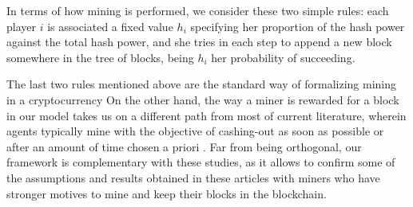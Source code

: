 %
%
In terms of how mining is performed, we consider these two simple rules: each player $i$ is associated
a fixed value $h_i$ specifying her proportion of the hash power 
against the total hash power, and  
she tries in each step to append a new block somewhere in the tree of blocks, being 
$h_i$ her probability of succeeding. 

The last two rules mentioned above 
are the standard way of 
formalizing mining in a cryptocurrency 
On the other hand, the way a miner is rewarded for a block in our model
takes us on a different path from most of current literature, wherein agents typically mine 
with the objective of cashing-out as soon as possible or after an amount of time chosen a priori   \cite{mininggames:2016,biais2018blockchain}. Far from being orthogonal, our framework is complementary with these studies, as it allows to confirm some of the assumptions and results obtained in these articles with miners who have stronger motives to mine and keep their blocks in the blockchain.


